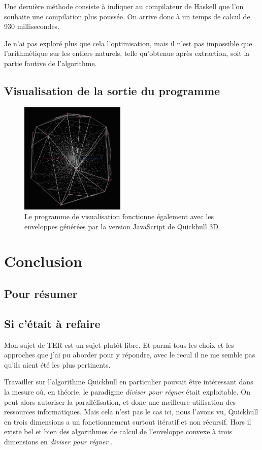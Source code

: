 \documentclass[]{article}
\begin{document}
Une dernière méthode consiste à indiquer au compilateur de Haskell que l'on souhaite une compilation plus poussée. On arrive donc à un temps de calcul de 930 millisecondes.

Je n'ai pas exploré plus que cela l'optimisation, mais il n'est pas impossible que l'arithmétique sur les entiers naturels, telle qu'obtenue après extraction, soit la partie fautive de l'algorithme.

\subsection{Visualisation de la sortie du programme}

\begin{figure}[H]
	\begin{center}
		\includegraphics[width=5cm]{viewer/screen1.png}
	\end{center}
	\caption{Le programme de visualisation fonctionne également avec les enveloppes générées par la version JavaScript de Quickhull 3D.}
\end{figure}

\section{Conclusion}
\subsection{Pour résumer}


\subsection{Si c'était à refaire}
Mon sujet de TER est un sujet plutôt libre. Et parmi tous les choix et les approches que j'ai pu aborder pour y répondre, avec le recul il ne me semble pas qu'ils aient été les plus pertinents.

Travailler sur l'algorithme Quickhull en particulier pouvait être intéressant dans la mesure où, en théorie, le paradigme \emph{diviser pour régner} était exploitable. On peut alors autoriser la parallélisation, et donc une meilleure utilisation des ressources informatiques. Mais cela n'est pas le cas ici, nous l'avons vu, Quickhull en trois dimensions a un fonctionnement surtout itératif et non récursif. Hors il existe bel et bien des algorithmes de calcul de l'enveloppe convexe à trois dimensions en \emph{diviser pour régner} \cite{https://doi.org/10.48550/arxiv.1205.1171}.
\end{document}

